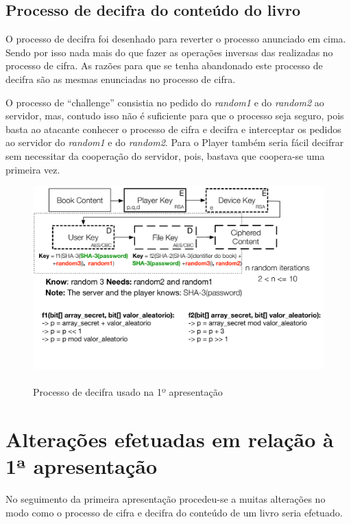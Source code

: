 \documentclass[pdftex,12pt,a4paper]{report}
\begin{document}
\subsection{Processo de decifra do conteúdo do livro}
O processo de decifra foi desenhado para reverter o processo anunciado em cima. Sendo por isso nada mais do que fazer as operações inversas das realizadas no processo de cifra. As razões para que se tenha abandonado este processo de decifra são as mesmas enunciadas no processo de cifra.

O processo de “challenge” consistia no pedido do \textit{random1} e do \textit{random2} ao servidor, mas, contudo isso não é suficiente para que o processo seja seguro, pois basta ao atacante conhecer o processo de cifra e decifra e interceptar os pedidos ao servidor do \textit{random1} e do \textit{random2}. Para o Player também seria fácil decifrar sem necessitar da cooperação do servidor, pois, bastava que coopera-se uma primeira vez.

\begin{figure}[!htb]
\center
 \includegraphics[width=135mm,scale=1]{filekey-initial-decrypt.pdf}
 \caption{\\Processo de decifra usado na 1º apresentação}\label{fig:eer}
\end{figure}

\section{Alterações efetuadas em relação à 1ª apresentação}

No seguimento da primeira apresentação procedeu-se a muitas alterações no modo como o processo de cifra e decifra do conteúdo de um livro seria efetuado.	
\end{document}
